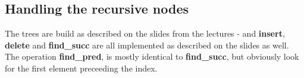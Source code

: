 \subsection*{Handling the recursive nodes}
The trees are build as described on the slides from the lectures - and \textbf{insert}, \textbf{delete} and \textbf{find\_succ} are all implemented as described on the slides as well. The operation \textbf{find\_pred}, is mostly identical to \textbf{find\_succ}, but obviously look for the first element preceeding the index.



